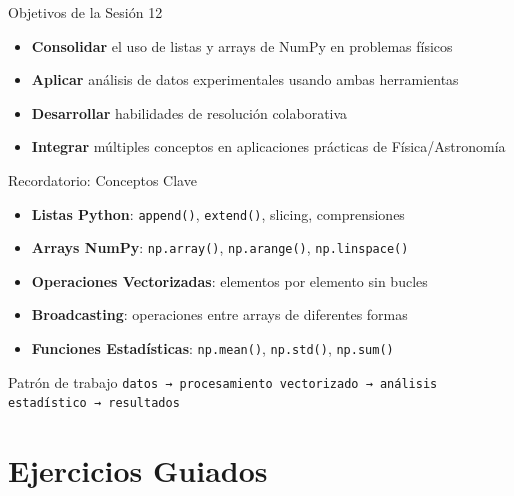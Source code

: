 \documentclass[10pt]{beamer}
\begin{document}
\begin{frame}{Objetivos de la Sesión 12}
  \begin{itemize}
    \item \textbf{Consolidar} el uso de listas y arrays de NumPy en problemas físicos
    \item \textbf{Aplicar} análisis de datos experimentales usando ambas herramientas
    \item \textbf{Desarrollar} habilidades de resolución colaborativa
    \item \textbf{Integrar} múltiples conceptos en aplicaciones prácticas de Física/Astronomía
  \end{itemize}
\end{frame}

\begin{frame}{Recordatorio: Conceptos Clave}
  \begin{itemize}
    \item \textbf{Listas Python}: \texttt{append()}, \texttt{extend()}, slicing, comprensiones
    \item \textbf{Arrays NumPy}: \texttt{np.array()}, \texttt{np.arange()}, \texttt{np.linspace()}
    \item \textbf{Operaciones Vectorizadas}: elementos por elemento sin bucles
    \item \textbf{Broadcasting}: operaciones entre arrays de diferentes formas
    \item \textbf{Funciones Estadísticas}: \texttt{np.mean()}, \texttt{np.std()}, \texttt{np.sum()}
  \end{itemize}
  
  \begin{block}{Patrón de trabajo}
    \texttt{datos → procesamiento vectorizado → análisis estadístico → resultados}
  \end{block}
\end{frame}


\section{Ejercicios Guiados}
\end{document}
